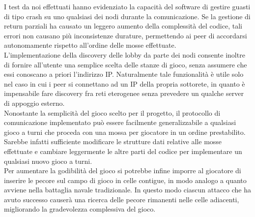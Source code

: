 I test da noi effettuati hanno evidenziato la capacità del software di gestire 
guasti di tipo crash su uno qualsiasi dei nodi durante la comunicazione. Se 
la gestione di return parziali ha causato un leggero aumento della complessità 
del codice, tali errori non causano più inconsistenze durature, permettendo ai 
peer di accordarsi autonomamente rispetto all'ordine delle mosse effettuate.
\\
L'implementazione della discovery delle lobby da parte dei nodi consente 
inoltre di fornire all'utente una semplice scelta delle stanze di gioco, senza 
assumere che essi conoscano a priori l'indirizzo IP. Naturalmente 
tale funzionalità è utile solo nel caso in cui i peer si connettano ad un IP 
della propria sottorete, in quanto è impensabile fare discovery fra reti 
eterogenee senza prevedere un qualche server di appoggio esterno.
\\
Nonostante la semplicità del gioco scelto per il progetto, il protocollo di 
comunicazione implementato può essere facilmente generalizzabile a qualsiasi 
gioco a turni che proceda con una mossa per giocatore in un ordine prestabilito.
Sarebbe infatti sufficiente modificare le strutture dati relative alle mosse 
effettuate e cambiare leggermente le altre parti del codice per implementare un 
qualsiasi nuovo gioco a turni.
\\
Per aumentare la godibilità del gioco si potrebbe infine imporre al giocatore 
di inserire le pecore sul campo di gioco in celle contigue, in modo analogo a 
quanto avviene nella battaglia navale tradizionale. In questo modo ciascun 
attacco che ha avuto successo causerà una ricerca delle pecore rimanenti nelle celle adiacenti,
migliorando la gradevolezza complessiva del gioco.